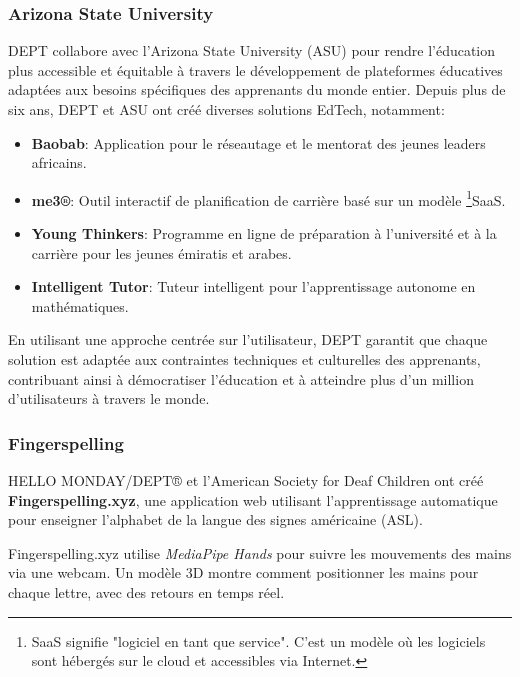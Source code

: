 \subsubsection{Arizona State University}

DEPT collabore avec l'Arizona State University (ASU) pour rendre l'éducation plus accessible et équitable à travers le développement de plateformes éducatives adaptées aux besoins spécifiques des apprenants du monde entier. Depuis plus de six ans, DEPT et ASU ont créé diverses solutions EdTech, notamment:

\begin{itemize}
    \item \textbf{Baobab}: Application pour le réseautage et le mentorat des jeunes leaders africains.
    \item \textbf{me3®}: Outil interactif de planification de carrière basé sur un modèle \footnote{SaaS signifie "logiciel en tant que service". C'est un modèle où les logiciels sont hébergés sur le cloud et accessibles via Internet.}SaaS.
    \item \textbf{Young Thinkers}: Programme en ligne de préparation à l’université et à la carrière pour les jeunes émiratis et arabes.
    \item \textbf{Intelligent Tutor}: Tuteur intelligent pour l'apprentissage autonome en mathématiques.
\end{itemize}

En utilisant une approche centrée sur l'utilisateur, DEPT garantit que chaque solution est adaptée aux contraintes techniques et culturelles des apprenants, contribuant ainsi à démocratiser l'éducation et à atteindre plus d'un million d'utilisateurs à travers le monde.

\subsubsection{Fingerspelling}

HELLO MONDAY/DEPT® et l'American Society for Deaf Children ont créé \textbf{Fingerspelling.xyz}, une application web utilisant l'apprentissage automatique pour enseigner l'alphabet de la langue des signes américaine (ASL).

Fingerspelling.xyz utilise \textit{MediaPipe Hands} pour suivre les mouvements des mains via une webcam. Un modèle 3D montre comment positionner les mains pour chaque lettre, avec des retours en temps réel.

